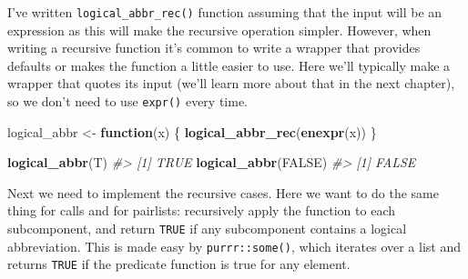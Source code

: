 \documentclass[]{book}
\newenvironment{Shaded}{\begin{snugshade}}{\end{snugshade}}
\newcommand{\CommentTok}[1]{\textcolor[rgb]{0.37,0.37,0.37}{\textit{#1}}}
\newcommand{\ControlFlowTok}[1]{\textcolor[rgb]{0.27,0.27,0.27}{\textbf{#1}}}
\newcommand{\DataTypeTok}[1]{\textcolor[rgb]{0.27,0.27,0.27}{#1}}
\newcommand{\KeywordTok}[1]{\textcolor[rgb]{0.27,0.27,0.27}{\textbf{#1}}}
\newcommand{\NormalTok}[1]{#1}
\newcommand{\OperatorTok}[1]{\textcolor[rgb]{0.43,0.43,0.43}{\textbf{#1}}}
\newcommand{\OtherTok}[1]{\textcolor[rgb]{0.37,0.37,0.37}{#1}}
\newcommand{\StringTok}[1]{\textcolor[rgb]{0.5,0.5,0.5}{#1}}
\begin{document}
\begin{Shaded}
\end{Shaded}

I've written \texttt{logical\_abbr\_rec()} function assuming that the input will be an expression as this will make the recursive operation simpler. However, when writing a recursive function it's common to write a wrapper that provides defaults or makes the function a little easier to use. Here we'll typically make a wrapper that quotes its input (we'll learn more about that in the next chapter), so we don't need to use \texttt{expr()} every time.

\begin{Shaded}
\begin{Highlighting}[]
\NormalTok{logical_abbr <-}\StringTok{ }\ControlFlowTok{function}\NormalTok{(x) \{}
  \KeywordTok{logical_abbr_rec}\NormalTok{(}\KeywordTok{enexpr}\NormalTok{(x))}
\NormalTok{\}}

\KeywordTok{logical_abbr}\NormalTok{(T)}
\CommentTok{#> [1] TRUE}
\KeywordTok{logical_abbr}\NormalTok{(}\OtherTok{FALSE}\NormalTok{)}
\CommentTok{#> [1] FALSE}
\end{Highlighting}
\end{Shaded}

Next we need to implement the recursive cases. Here we want to do the same thing for calls and for pairlists: recursively apply the function to each subcomponent, and return \texttt{TRUE} if any subcomponent contains a logical abbreviation. This is made easy by \texttt{purrr::some()}, which iterates over a list and returns \texttt{TRUE} if the predicate function is true for any element.
\end{document}
